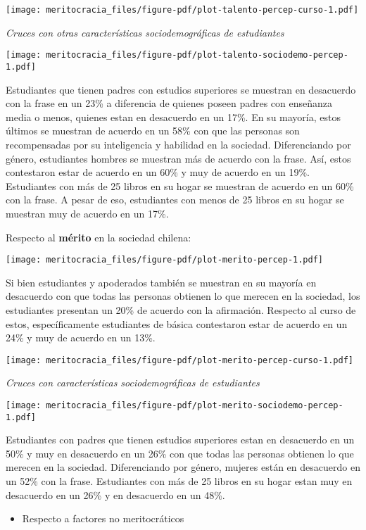 \documentclass[
  letterpaper,
  DIV=11,
  numbers=noendperiod]{scrreprt}
\providecommand{\tightlist}{%
  \setlength{\itemsep}{0pt}\setlength{\parskip}{0pt}}\usepackage{longtable,booktabs,array}
\begin{document}
\texttt{[image: meritocracia\_files/figure-pdf/plot-talento-percep-curso-1.pdf]}

\emph{Cruces con otras características sociodemográficas de estudiantes}

\texttt{[image: meritocracia\_files/figure-pdf/plot-talento-sociodemo-percep-1.pdf]}

Estudiantes que tienen padres con estudios superiores se muestran en
desacuerdo con la frase en un 23\% a diferencia de quienes poseen padres
con enseñanza media o menos, quienes estan en desacuerdo en un 17\%. En
su mayoría, estos últimos se muestran de acuerdo en un 58\% con que las
personas son recompensadas por su inteligencia y habilidad en la
sociedad. Diferenciando por género, estudiantes hombres se muestran más
de acuerdo con la frase. Así, estos contestaron estar de acuerdo en un
60\% y muy de acuerdo en un 19\%. Estudiantes con más de 25 libros en su
hogar se muestran de acuerdo en un 60\% con la frase. A pesar de eso,
estudiantes con menos de 25 libros en su hogar se muestran muy de
acuerdo en un 17\%.

Respecto al \textbf{mérito} en la sociedad chilena:

\texttt{[image: meritocracia\_files/figure-pdf/plot-merito-percep-1.pdf]}

Si bien estudiantes y apoderados también se muestran en su mayoría en
desacuerdo con que todas las personas obtienen lo que merecen en la
sociedad, los estudiantes presentan un 20\% de acuerdo con la
afirmación. Respecto al curso de estos, específicamente estudiantes de
básica contestaron estar de acuerdo en un 24\% y muy de acuerdo en un
13\%.

\texttt{[image: meritocracia\_files/figure-pdf/plot-merito-percep-curso-1.pdf]}

\emph{Cruces con características sociodemográficas de estudiantes}

\texttt{[image: meritocracia\_files/figure-pdf/plot-merito-sociodemo-percep-1.pdf]}

Estudiantes con padres que tienen estudios superiores estan en
desacuerdo en un 50\% y muy en desacuerdo en un 26\% con que todas las
personas obtienen lo que merecen en la sociedad. Diferenciando por
género, mujeres están en desacuerdo en un 52\% con la frase. Estudiantes
con más de 25 libros en su hogar estan muy en desacuerdo en un 26\% y en
desacuerdo en un 48\%.

\begin{itemize}
\tightlist
\item
  Respecto a factores no meritocráticos
\end{itemize}
\end{document}
